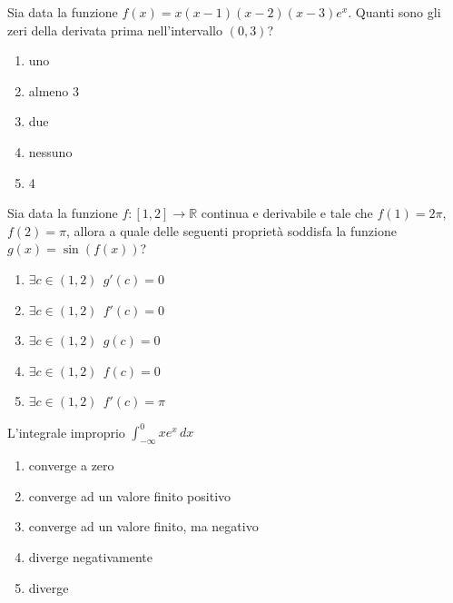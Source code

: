 \begin{quiz}
Sia data la funzione $f(x)=x(x-1)(x-2)(x-3)e^x$. Quanti sono gli zeri della derivata prima nell'intervallo $(0,3)$?
\begin{enumerate}
\item uno
\item almeno 3
\item due
\item nessuno
\item 4
\end{enumerate}
\end{quiz}

\begin{quiz}
Sia data la funzione $f:[1,2]\to\mathbb R$ continua e derivabile e tale che $f(1)=2\pi$, $f(2)=\pi$, allora a quale delle seguenti propriet\`a soddisfa la funzione $g(x)=\sin(f(x))$?
\begin{enumerate}
\item $\exists c\in(1,2)\ \ g'(c)=0$
\item $\exists c\in(1,2)\ \ f'(c)=0$
\item $\exists c\in(1,2)\ \ g(c)=0$
\item $\exists c\in(1,2)\ \ f(c)=0$
\item $\exists c\in(1,2)\ \ f'(c)=\pi$
\end{enumerate}
\end{quiz}

\begin{quiz}
L'integrale improprio $\displaystyle\int_{-\infty}^0xe^x\,dx$
\begin{enumerate}
\item converge a zero
\item converge ad un valore finito positivo
\item converge ad un valore finito, ma negativo
\item diverge negativamente
\item diverge
\end{enumerate}
\end{quiz}

